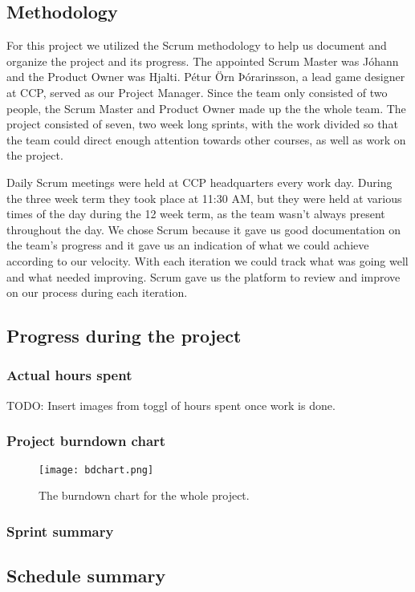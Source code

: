 \subsection{Methodology}
	For this project we utilized the Scrum methodology to help us document and organize the project and its progress. The appointed Scrum Master was Jóhann and the Product Owner was Hjalti. Pétur Örn Þórarinsson, a lead game designer at CCP, served as our Project Manager. Since the team only consisted of two people, the Scrum Master and Product Owner made up the the whole team. The project consisted of seven, two week long sprints, with the work divided so that the team could direct enough attention towards other courses, as well as work on the project.

	Daily Scrum meetings were held at CCP headquarters every work day. During the three week term they took place at 11:30 AM, but they were held at various times of the day during the 12 week term, as the team wasn't always present throughout the day. We chose Scrum because it gave us good documentation on the team's progress and it gave us an indication of what we could achieve according to our velocity. With each iteration we could track what was going well and what needed improving. Scrum gave us the platform to review and improve on our process during each iteration.

\subsection{Progress during the project}

	\subsubsection{Actual hours spent}

	TODO: Insert images from toggl of hours spent once work is done.

	\subsubsection{Project burndown chart}
		
		\begin{figure}[H]
		  \centering
		  \graphicspath{ {./graphics/} }
		  \centerline{\texttt{[image: bdchart.png]}}
		  \caption{\label{fig:bdchart} The burndown chart for the whole project.}
		\end{figure}

	\subsubsection{Sprint summary}

\subsection{Schedule summary}